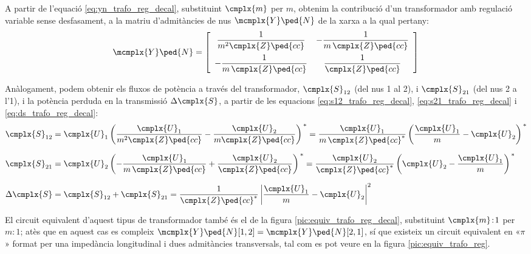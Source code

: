 A partir de l'equació  \eqref{eq:yn_trafo_reg_decal}, substituint
$\cmplx{m}$ per $m$, obtenim la contribució d'un transformador amb
regulació variable sense desfasament, a la matriu d'admitàncies de nus
$\mcmplx{Y}\ped{N}$ de la xarxa a la qual pertany:
\begin{equation}
   \mcmplx{Y}\ped{N} = 
   \begin{bmatrix}\begin{array}{cc} 
     \dfrac{1}{m^2 \cmplx{Z}\ped{cc}} & - \dfrac{1}{m \,\cmplx{Z}\ped{cc}} \\[2.5ex]
     - \dfrac{1}{m \,\cmplx{Z}\ped{cc}} & \dfrac{1}{\cmplx{Z}\ped{cc}}
   \end{array}\end{bmatrix}
\end{equation}


Anàlogament, podem obtenir els fluxos de potència a través del
transformador, $\cmplx{S}_{12}$ (del nus 1 al 2), i $\cmplx{S}_{21}$
(del nus 2 a l'1), i la potència perduda en la transmissió
$\Delta\cmplx{S}$, a partir de les equacions
\eqref{eq:s12_trafo_reg_decal},  \eqref{eq:s21_trafo_reg_decal} i
\eqref{eq:ds_trafo_reg_decal}:  
\begin{align}
   \cmplx{S}_{12} &= \cmplx{U}_1 \left( \frac{\cmplx{U}_1}{m^2 \cmplx{Z}\ped{cc}} - \frac{\cmplx{U}_2}{m \cmplx{Z}\ped{cc}} \right)^{\,*} = \frac{\cmplx{U}_1}{m \,\cmplx{Z}\ped{cc}^*} \left( \frac{\cmplx{U}_1}{m} - \cmplx{U}_2 \right)^{\,*}  \\[1.5ex]
   \cmplx{S}_{21} &= \cmplx{U}_2 \left( - \frac{\cmplx{U}_1}{m \,\cmplx{Z}\ped{cc}} + \frac{\cmplx{U}_2} {\cmplx{Z}\ped{cc}} \right)^{\,*} = \frac{\cmplx{U}_2}{\cmplx{Z}\ped{cc}^*} \left(  \cmplx{U}_2 - \frac{\cmplx{U}_1}{m}  \right)^{\,*} \\[1.5ex]
 \Delta\cmplx{S} &= \cmplx{S}_{12} + \cmplx{S}_{21} = \frac{1}{\cmplx{Z}\ped{cc}^*}  \left|
    \frac{\cmplx{U}_1}{m} - \cmplx{U}_2 \right|^2
\end{align}


El circuit equivalent d'aquest tipus de transformador també és el de la
 figura \vref{pic:equiv_trafo_reg_decal}, substituint $\cmplx{m}\!:\!1$ per $m\!:\!1$;  atès que en aquest cas es compleix $\mcmplx{Y}\ped{N}[1,2] = \mcmplx{Y}\ped{N}[2,1]$, sí que
 existeix un circuit equivalent en «$\pi$» format per una impedància longitudinal i dues admitàncies transversals, tal com es pot veure en la figura  \vref{pic:equiv_trafo_reg}.

